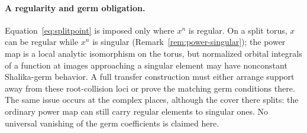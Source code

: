 \documentclass[11pt]{article}
\theoremstyle{plain}
\theoremstyle{definition}
\begin{document}
\paragraph{A regularity and germ obligation.}
Equation~\eqref{eq:splitpoint} is imposed only where $x^n$ is
regular.  On a split torus, $x$ can be regular while $x^n$ is
singular (Remark~\ref{rem:power-singular}); the power map is a
local analytic isomorphism on the torus, but normalized orbital
integrals of a function at images approaching a singular element
may have nonconstant Shalika-germ behavior.  A full transfer
construction must either arrange support away from these
root-collision loci or prove the matching germ conditions there.
The same issue occurs at the complex places, although the cover
there splits: the ordinary power map can still carry regular
elements to singular ones. No universal vanishing of the germ
coefficients is claimed here.
\end{document}
